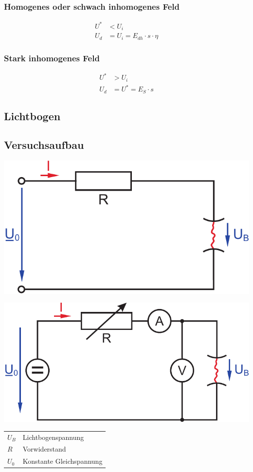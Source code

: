 \documentclass[a4paper,twocolumn,10pt]{article}
\begin{document}
\subsubsection{Homogenes oder schwach inhomogenes Feld}
\begin{equation*}
\begin{split}
U^*&<U_i\\
U_d&=U_i=E_{dh}\cdot s\cdot\eta
\end{split}
\end{equation*}

\subsubsection{Stark inhomogenes Feld}
\begin{equation*}
\begin{split}
U^*&>U_i\\
U_d&=U^*=E_S\cdot s
\end{split}
\end{equation*}

\subsection{Lichtbogen}

\subsection{Versuchsaufbau}
\begin{center}
\includegraphics[width=0.7\columnwidth]{Grafiken/Lichtbogen_Stromkreis}
\end{center}
\begin{center}
\includegraphics[width=0.7\columnwidth]{Grafiken/Lichtbogen_Stromkreis2}
\end{center}
\begin{tabular}{ll}
$U_B$ & Lichtbogenspannung\\
$R$ & Vorwiderstand\\
$U_0$ & Konstante Gleichspannung
\end{tabular}
\end{document}
